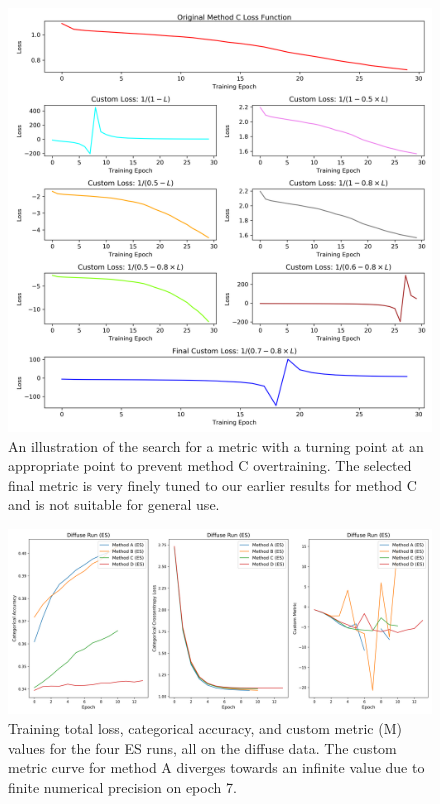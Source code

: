 \begin{figure}[t]
  \centering
  \includegraphics[width=\textwidth]{figures/earlystopplot.png}
  \caption{An illustration of the search for a metric with a turning point at an appropriate point to prevent method C overtraining. The selected final metric is very finely tuned to our earlier results for method C and is not suitable for general use.}
  \label{fig:earlystopplot}
\end{figure}

\begin{figure}[t]
  \centering
  \includegraphics[width=\textwidth]{figures/trainlogES.png}
  \caption{Training total loss, categorical accuracy, and custom metric (M) values for the four ES runs, all on the diffuse data. The custom metric curve for method A diverges towards an infinite value due to finite numerical precision on epoch 7.
  }
\label{fig:trainlogES}
\end{figure}

